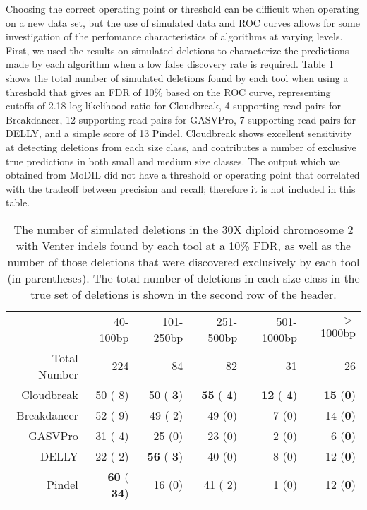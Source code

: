 \documentclass[11pt]{article}
\begin{document}
Choosing the correct operating point or threshold can be difficult when operating on a new data set, but the use of simulated data and ROC curves allows for some investigation of the perfomance characteristics of algorithms at varying levels. First, we used the results on simulated deletions to characterize the predictions made by each algorithm when a low false discovery rate is required. Table \ref{chr2DeletionPredsFDR10} shows the total number of simulated deletions found by each tool when using a threshold that gives an FDR of 10\% based on the ROC curve, representing cutoffs of 2.18 log likelihood ratio for Cloudbreak, 4 supporting read pairs for Breakdancer, 12 supporting read pairs for GASVPro, 7 supporting read pairs for DELLY, and a simple score of 13 Pindel. Cloudbreak shows excellent sensitivity at detecting deletions from each size class, and contributes a number of exclusive true predictions in both small and medium size classes. The output which we obtained from MoDIL did not have a threshold or operating point that correlated with the tradeoff between precision and recall; therefore it is not included in this table.

\begin{table}[t]
\begin{center}
\begin{tabular}{rrrrrr}
  \hline
 & 40-100bp  & 101-250bp  & 251-500bp & 501-1000bp & $>$ 1000bp \\ 
 Total Number & 224 &  84 & 82 &  31 & 26\\ 
  \hline
  Cloudbreak  &   50 (   8)  &   50 (\textbf{   3}) &  \textbf{  55} (\textbf{   4}) & \textbf{  12} (\textbf{   4}) & \textbf{  15} (\textbf{0}) \\ 
  Breakdancer &   52 (   9)  &   49 (   2) &    49 (0) &    7 (0) &   14 (\textbf{0}) \\ 
  GASVPro     &   31 (   4)  &   25 (0) &    23 (0) &    2 (0) &    6 (\textbf{0}) \\ 
  DELLY       &   22 (   2)  & \textbf{  56} (\textbf{   3}) &    40 (0) &    8 (0) &   12 (\textbf{0}) \\ 
  Pindel      & \textbf{  60} (\textbf{  34})  &   16 (0) &    41 (   2) &    1 (0) &   12 (\textbf{0})\\ 
   \hline
\end{tabular}
\end{center}
\caption{The number of simulated deletions in the 30X diploid chromosome 2 with Venter indels found by each tool at a 10\% FDR, as well as the number of those deletions that were discovered exclusively by each tool (in parentheses). The total number of deletions in each size class in the true set of deletions is shown in the second row of the header.}
\label{chr2DeletionPredsFDR10}
\end{table}
\end{document}
